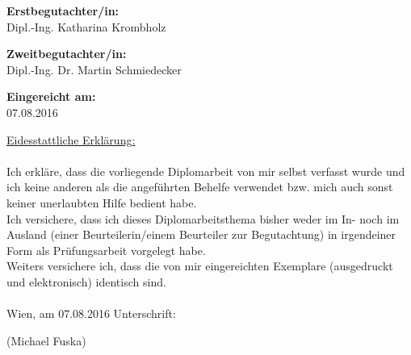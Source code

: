 \begin{center}
\hspace*{-1.0cm} \textbf{Erstbegutachter/in:} \\
\hspace*{-1.0cm} Dipl.-Ing. Katharina Krombholz \\

\vspace{0.5cm}

\hspace*{-1.0cm} \textbf{Zweitbegutachter/in:} \\
\hspace*{-1.0cm} Dipl.-Ing. Dr. Martin Schmiedecker \\


\vspace{1.4cm}

\hspace*{-1.0cm} \textbf{Eingereicht am:} \\
\hspace*{-1.0cm} 07.08.2016 \\

\end{center}

\newpage

\pagestyle{empty}

\vspace*{14.5cm}  %

\hspace*{-0.7cm} \underline{Eidesstattliche Erklärung:}\\\\
Ich erkläre, dass die vorliegende Diplomarbeit von mir selbst verfasst wurde und ich keine anderen als die angeführten Behelfe verwendet bzw. mich auch sonst keiner unerlaubten Hilfe bedient habe.\\
Ich versichere, dass ich dieses Diplomarbeitsthema bisher weder im In- noch im Ausland (einer Beurteilerin/einem Beurteiler zur Begutachtung) in irgendeiner Form als Prüfungsarbeit vorgelegt habe.\\
Weiters versichere ich, dass die von mir eingereichten Exemplare (ausgedruckt und elektronisch) identisch sind.\\\\
Wien, am 07.08.2016 \hspace{6cm} Unterschrift:\\
\vspace*{1cm}

\hspace{9.3cm} (Michael Fuska)




